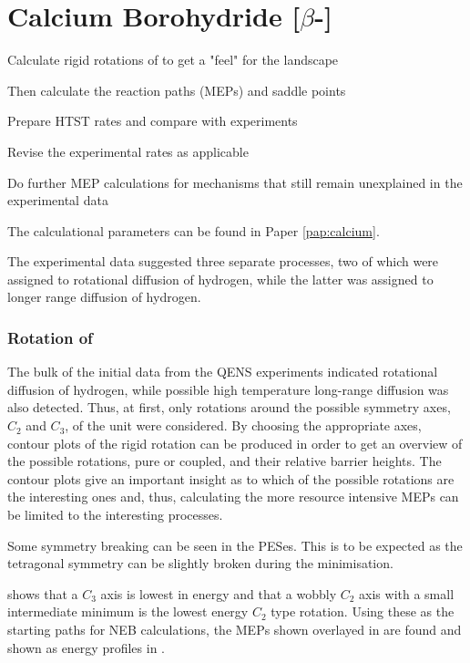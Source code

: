 \section{Calcium Borohydride [$\beta$-]}
\label{sec:borohydrides-calcium}

\bit
\item Calculate rigid rotations of  to get a "feel" for the landscape
\item Then calculate the reaction paths (MEPs) and saddle points
\item Prepare HTST rates and compare with experiments
\item Revise the experimental rates as applicable
\item Do further MEP calculations for mechanisms that still remain unexplained in the experimental data
\eit

The calculational parameters can be found in Paper \ref{pap:calcium}.

The experimental data suggested three separate processes, two of which were assigned to rotational diffusion of hydrogen, while the latter was assigned to longer range diffusion of hydrogen.

\subsubsection{Rotation of }
The bulk of the initial data from the QENS experiments indicated rotational diffusion of hydrogen, while possible high temperature long-range diffusion was also detected.
Thus, at first, only rotations around the possible symmetry axes, $C_2$ and $C_3$, of the  unit were considered.
By choosing the appropriate axes, contour plots of the rigid rotation can be produced in order to get an overview of the possible rotations, pure or coupled, and their relative barrier heights.
The contour plots give an important insight as to which of the possible rotations are the interesting ones and, thus, calculating the more resource intensive MEPs can be limited to the interesting processes.

Some symmetry breaking can be seen in the PESes.
This is to be expected as the tetragonal symmetry can be slightly broken during the minimisation.

 shows that a $C_3$ axis is lowest in energy and that a wobbly $C_2$ axis with a small intermediate minimum is the lowest energy $C_2$ type rotation.
Using these as the starting paths for NEB calculations, the MEPs shown overlayed in  are found and shown as energy profiles in .

